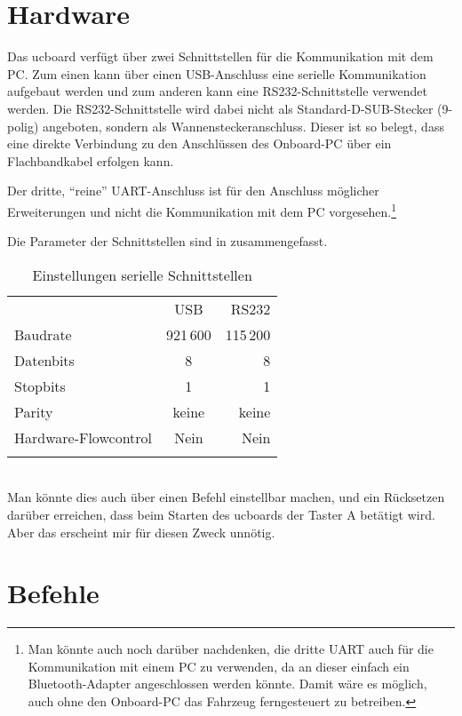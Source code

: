 \section{Hardware}

Das ucboard verfügt über zwei Schnittstellen für die Kommunikation mit dem PC. Zum einen kann über einen USB-Anschluss eine serielle Kommunikation aufgebaut werden und zum anderen kann eine RS232-Schnittstelle verwendet werden. Die RS232-Schnittstelle wird dabei nicht als Standard-D-SUB-Stecker (9-polig) angeboten, sondern als Wannensteckeranschluss. Dieser ist so belegt, dass eine direkte Verbindung zu den Anschlüssen des Onboard-PC über ein Flachbandkabel erfolgen kann.

Der dritte, "`reine"' UART-Anschluss ist für den Anschluss möglicher Erweiterungen und nicht die Kommunikation mit dem PC vorgesehen.\footnote{Man könnte auch noch darüber nachdenken, die dritte UART auch für die Kommunikation mit einem PC zu verwenden, da an dieser einfach ein Bluetooth-Adapter angeschlossen werden könnte. Damit wäre es möglich, auch ohne den Onboard-PC das Fahrzeug ferngesteuert zu betreiben.}


Die Parameter der Schnittstellen sind in  zusammengefasst.

\begin{table}%
	\centering
	\caption{Einstellungen serielle Schnittstellen}
	\label{tab:Comm:UARTParam}
	\begin{tabular}{lcr}
			\mytoprule
			 & USB & RS232 \\
			\mymidrule
			Baudrate & 921\,600 & 115\,200 \\
			Datenbits & 8 & 8 \\
			Stopbits & 1 & 1 \\
			Parity & keine & keine \\
			Hardware-Flowcontrol & Nein & Nein \\
			\mybottomrule
	\end{tabular}\\
	\color[rgb]{1,0,0}{ToDo: Testen, welche Baudrate jeweils maximal möglich ist!} \textcolor[rgb]{0.75,0.75,0.75}{\footnotesize{Man könnte dies auch über einen Befehl einstellbar machen, und ein Rücksetzen darüber erreichen, dass beim Starten des ucboards \zB der Taster A betätigt wird. Aber das erscheint mir für diesen Zweck unnötig.}}
\end{table}


\section{Befehle}


